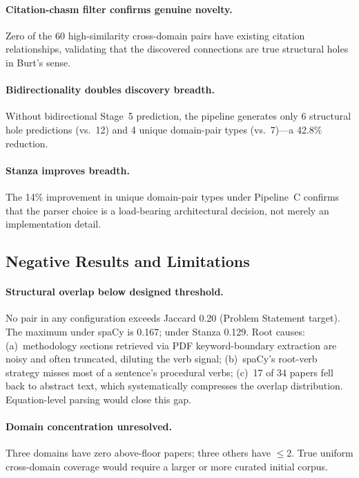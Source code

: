 \documentclass[11pt]{article}
\begin{document}
\paragraph{Citation-chasm filter confirms genuine novelty.}
Zero of the 60 high-similarity cross-domain pairs have existing citation
relationships, validating that the discovered connections are true structural
holes in Burt's sense.

\paragraph{Bidirectionality doubles discovery breadth.}
Without bidirectional Stage~5 prediction, the pipeline generates only
6 structural hole predictions (vs.\ 12) and 4 unique domain-pair types
(vs.\ 7)---a 42.8\% reduction.

\paragraph{Stanza improves breadth.}
The 14\% improvement in unique domain-pair types under Pipeline~C confirms
that the parser choice is a load-bearing architectural decision, not
merely an implementation detail.

\subsection{Negative Results and Limitations}

\paragraph{Structural overlap below designed threshold.}
No pair in any configuration exceeds Jaccard 0.20 (Problem Statement target).
The maximum under spaCy is 0.167; under Stanza 0.129. Root causes:
(a)~methodology sections retrieved via PDF keyword-boundary extraction are
noisy and often truncated, diluting the verb signal; (b)~spaCy's root-verb
strategy misses most of a sentence's procedural verbs; (c)~17 of 34
papers fell back to abstract text, which systematically compresses the
overlap distribution. Equation-level parsing would close this gap.

\paragraph{Domain concentration unresolved.}
Three domains have zero above-floor papers; three others have $\leq$2.
True uniform cross-domain coverage would require a larger or more curated
initial corpus.
\end{document}
